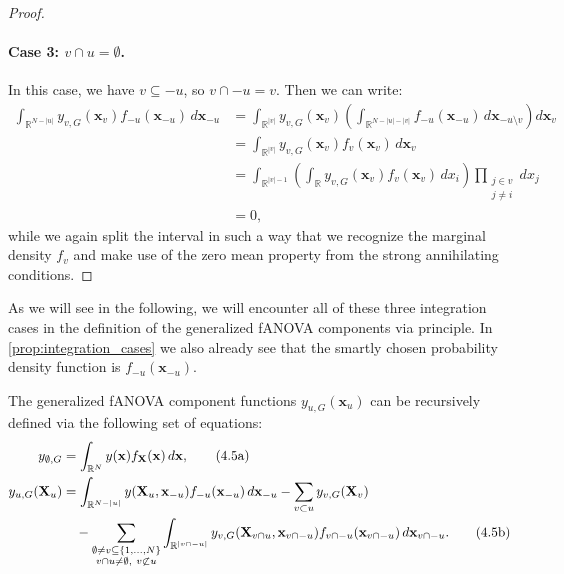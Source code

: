 \begin{proof}
\paragraph{Case 3: \( v \cap u = \emptyset \).}
In this case, we have \( v \subseteq -u \), so \( v \cap -u = v \). Then we can write:
\[
\begin{aligned}
\int_{\mathbb{R}^{N - |u|}} y_{v,G}(\mathbf{x}_v) f_{-u}(\mathbf{x}_{-u}) \, d\mathbf{x}_{-u}
&= \int_{\mathbb{R}^{|v|}} y_{v,G}(\mathbf{x}_v)
\left( \int_{\mathbb{R}^{N - |u| - |v|}} f_{-u}(\mathbf{x}_{-u}) \, d\mathbf{x}_{-u \setminus v} \right)
d\mathbf{x}_v \\
&= \int_{\mathbb{R}^{|v|}} y_{v,G}(\mathbf{x}_v) f_v(\mathbf{x}_v) \, d\mathbf{x}_v \\
&= \int_{\mathbb{R}^{|v|-1}} \left( \int_{\mathbb{R}} y_{v,G}(\mathbf{x}_v) f_v(\mathbf{x}_v) \, dx_i \right)
\prod_{\substack{j \in v \\ j \ne i}} dx_j \\
&= 0,
\end{aligned}
\]
while we again split the interval in such a way that we recognize the marginal density $f_v$ and make use of the zero mean property from the strong annihilating conditions.

\end{proof}

As we will see in the following, we will encounter all of these three integration cases in the definition of the generalized fANOVA components via \cite{rahman2014} principle.
In \autoref{prop:integration_cases} we also already see that the smartly chosen probability density function is $f_{-u}(\boldsymbol{x}_{-u})$.


\begin{theorem}
The generalized fANOVA component functions \( y_{u,G}(\mathbf{x}_u) \) can be recursively defined via the following set of equations:
\begin{align}
y_{\emptyset,G} &= \int_{\mathbb{R}^N} y(\mathbf{x}) f_{\mathbf{X}}(\mathbf{x}) \, d\mathbf{x}, \tag{4.5a} \\
y_{u,G}(\mathbf{X}_u) &= \int_{\mathbb{R}^{N - |u|}} y(\mathbf{X}_u, \mathbf{x}_{-u}) f_{-u}(\mathbf{x}_{-u}) \, d\mathbf{x}_{-u}
- \sum_{v \subset u} y_{v,G}(\mathbf{X}_v) \notag \\
&\quad - \sum_{\substack{\emptyset \ne v \subseteq \{1,\dots,N\} \\ v \cap u \ne \emptyset,\ v \not\subset u}} 
\int_{\mathbb{R}^{|v \cap -u|}} y_{v,G}(\mathbf{X}_{v \cap u}, \mathbf{x}_{v \cap -u}) f_{v \cap -u}(\mathbf{x}_{v \cap -u}) \, d\mathbf{x}_{v \cap -u}. \tag{4.5b}
\end{align}
\end{theorem}


